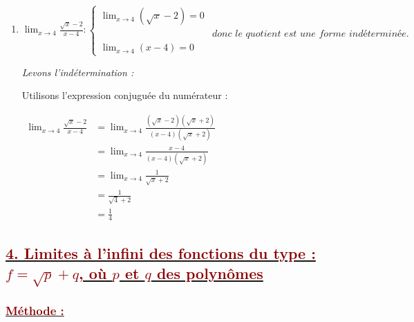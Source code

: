 \documentclass[12pt,a4paper]{article}
\begin{document}
\begin{enumerate}
    Or $\displaystyle \lim_{x \to 0^+} \sqrt{x} = 0^+$, donc $\displaystyle \lim_{x \to 0^+} \frac{1}{\sqrt{x}} = +\infty$.
    
     

    \vspace{0.6cm}

    \item 
    $
    \displaystyle \lim_{x \to 4} \frac{\sqrt{x} - 2}{x - 4}:
    \begin{cases}
    \displaystyle \lim_{x \to 4} (\sqrt{x} - 2) = 0\\[3mm]
    &\textit{donc le quotient est une forme indéterminée.}\\
    \displaystyle \lim_{x \to 4} (x - 4) = 0
    \end{cases}
    $

    \textit{Levons l'indétermination :}
    
    Utilisons l'expression conjuguée du numérateur :
    
    $
    \begin{aligned}
    \displaystyle \lim_{x \to 4} \frac{\sqrt{x} - 2}{x - 4} &= \displaystyle \lim_{x \to 4} \frac{(\sqrt{x} - 2)(\sqrt{x} + 2)}{(x - 4)(\sqrt{x} + 2)}\\
    &= \displaystyle \lim_{x \to 4} \frac{x - 4}{(x - 4)(\sqrt{x} + 2)}\\
    &= \displaystyle \lim_{x \to 4} \frac{1}{\sqrt{x} + 2}\\
    &= \frac{1}{\sqrt{4} + 2}\\
    &= \frac{1}{4}
    \end{aligned}
    $
    
     
\end{enumerate}

\subsection*{\underline{\textcolor{darkred}{4. Limites à l'infini des fonctions du type : $f = \sqrt{p} + q$, où $p$ et $q$ des polynômes}}}
\vspace{0.2cm}

\subsubsection*{\underline{\textcolor{darkred}{ Méthode : }}}
\end{document}
